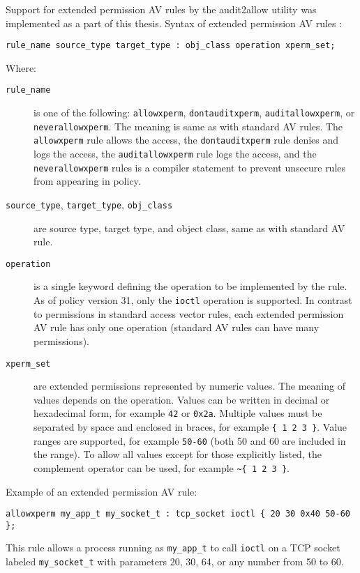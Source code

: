 Support for extended permission AV rules by the audit2allow utility was
implemented as a part of this thesis. Syntax of extended permission AV rules
\cite{xpermrules}:
\begin{lstlisting}[language=te]
rule_name source_type target_type : obj_class operation xperm_set;
\end{lstlisting}
Where:
\begin{description}
    \item [\texttt{rule\_name}] is one of the following: \texttt{allowxperm},
        \texttt{dontauditxperm}, \texttt{auditallowxperm}, or
        \texttt{neverallowxperm}. The meaning is same as with standard AV rules.
        The \texttt{allowxperm} rule allows the access, the
        \texttt{dontauditxperm} rule denies and logs the access, the
        \texttt{auditallowxperm} rule logs the access, and the
        \texttt{neverallowxperm} rules is a compiler statement to prevent
        unsecure rules from appearing in policy.
    \item [\texttt{source\_type}, \texttt{target\_type}, \texttt{obj\_class}]
        are source type, target type, and object class, same as with standard AV
        rule.
    \item [\texttt{operation}] is a single keyword defining the operation to be
        implemented by the rule. As of policy version 31, only the
        \texttt{ioctl} operation is supported. In contrast to permissions in
        standard access vector rules, each extended permission AV rule has only
        one operation (standard AV rules can have many permissions).
    \item [\texttt{xperm\_set}] are extended permissions represented by numeric
        values. The meaning of values depends on the operation. Values can be
        written in decimal or hexadecimal form, for example \texttt{42} or
        \texttt{0x2a}. Multiple values must be separated by space and enclosed
        in braces, for example \texttt{\{ 1 2 3 \}}. Value ranges are supported,
        for example \texttt{50-60} (both 50 and 60 are included in the range).
        To allow all values except for those explicitly listed, the complement
        operator can be used, for example \texttt{\textasciitilde \{ 1 2 3 \}}.
\end{description}

Example of an extended permission AV rule:
\begin{lstlisting}[language=te]
allowxperm my_app_t my_socket_t : tcp_socket ioctl { 20 30 0x40 50-60 };
\end{lstlisting}
This rule allows a process running as \texttt{my\_app\_t} to call \texttt{ioctl}
on a TCP socket labeled \texttt{my\_socket\_t} with parameters 20, 30, 64, or
any number from 50 to 60.

